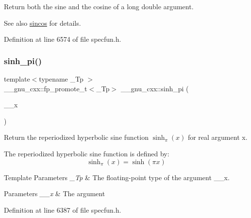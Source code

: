 Return both the sine and the cosine of a {\ttfamily  long double } argument.

\begin{DoxySeeAlso}{See also}
\hyperlink{group__mathsf__gnu_ga8041c24b528475bcf8a4178e484652a3}{sincos} for details. 
\end{DoxySeeAlso}


Definition at line 6574 of file specfun.\+h.

\mbox{\label{group__mathsf__gnu_gade43453b87b6b38c05b3fcce40870542}} 
\subsubsection{\texorpdfstring{sinh\+\_\+pi()}{sinh\_pi()}}
{\footnotesize\ttfamily template$<$typename \+\_\+\+Tp $>$ \\
\+\_\+\+\_\+gnu\+\_\+cxx\+::fp\+\_\+promote\+\_\+t$<$\+\_\+\+Tp$>$ \+\_\+\+\_\+gnu\+\_\+cxx\+::sinh\+\_\+pi (\begin{DoxyParamCaption}\item[{\+\_\+\+Tp}]{\+\_\+\+\_\+x }\end{DoxyParamCaption})\hspace{0.3cm}{\ttfamily [inline]}}

Return the reperiodized hyperbolic sine function $ \sinh_\pi(x) $ for real argument {\ttfamily x}.

The reperiodized hyperbolic sine function is defined by\+: \[ \sinh_\pi(x) = \sinh(\pi x) \]


\begin{DoxyTemplParams}{Template Parameters}
{\em \+\_\+\+Tp} & The floating-\/point type of the argument {\ttfamily \+\_\+\+\_\+x}. \\
\hline
\end{DoxyTemplParams}

\begin{DoxyParams}{Parameters}
{\em \+\_\+\+\_\+x} & The argument \\
\hline
\end{DoxyParams}


Definition at line 6387 of file specfun.\+h.

\mbox{\label{group__mathsf__gnu_ga74103f57ab0d97126732f3cb276c5ab3}} 
